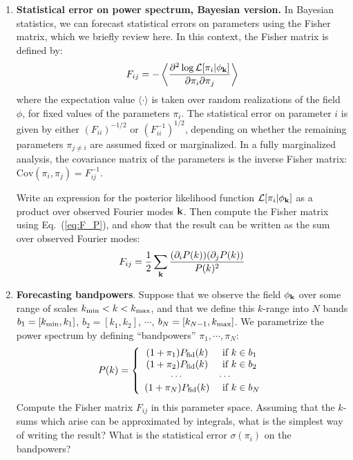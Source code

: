 \documentclass[aps,prd,superscriptaddress,groupedaddress,nofootinbib,nobibnotes]{revtex4}
\newcommand{\be}{\begin{equation}}
\newcommand{\ee}{\end{equation}}
\def\k{{\bf k}}
\def\L{{\mathcal L}}
\begin{document}
\begin{enumerate}
\setcounter{enumi}{\value{enumi_save}}

\item {\bf Statistical error on power spectrum, Bayesian version.}
  In Bayesian statistics, we can forecast statistical errors on parameters using the Fisher matrix,
  which we briefly review here.  In this context, the Fisher matrix is defined by:
\be
F_{ij} = -\left\langle \frac{\partial^2\log\L[\pi_i|\phi_{\k}]}{\partial\pi_i \partial\pi_j} \right\rangle  \label{eq:F_P}
\ee
  where the expectation value $\langle \cdot \rangle$ is taken over random realizations of the field $\phi$,
  for fixed values of the parameters $\pi_i$.
  The statistical error on parameter $i$ is given by either $(F_{ii})^{-1/2}$ or $(F^{-1}_{ii})^{1/2}$,
  depending on whether the remaining parameters $\pi_{j\ne i}$ are assumed fixed or marginalized.  In a
  fully marginalized analysis, the covariance matrix of the parameters is the inverse Fisher matrix:
  $\mbox{Cov}(\pi_i, \pi_j) = F^{-1}_{ij}$.

  Write an expression for the posterior likelihood function $\L[\pi_i|\phi_{\k}]$ as a product over observed Fourier modes $\k$.
  Then compute the Fisher matrix using Eq.~(\ref{eq:F_P}), and show that the result can be written as the sum over observed Fourier modes:
\be
F_{ij} = \frac{1}{2} \sum_{\k} \frac{(\partial_i P(k)) (\partial_j P(k))}{P(k)^2}  \label{eq:F_P2}
\ee
\item {\bf Forecasting bandpowers}.
  Suppose that we observe the field $\phi_{\k}$ over some range of scales $k_{\rm min} < k < k_{\rm max}$,
  and that we define this $k$-range into $N$ bands $b_1 = [k_{\rm min}, k_1]$, $b_2 = [k_1, k_2]$, $\cdots$, 
  $b_N = [k_{N-1}, k_{\rm max}]$.  We parametrize the power spectrum by defining ``bandpowers'' $\pi_1, \cdots, \pi_N$:
\be
 P(k) = \left\{
  \begin{array}{cl}
    (1 + \pi_1) P_{\rm fid}(k) & \mbox{ if $k\in b_1$} \\
    (1 + \pi_2) P_{\rm fid}(k) & \mbox{ if $k\in b_2$} \\
      \cdots & \cdots \\
    (1 + \pi_N) P_{\rm fid}(k) & \mbox{ if $k\in b_N$}
  \end{array} \right.
\ee
  Compute the Fisher matrix $F_{ij}$ in this parameter space.
  Assuming that the $k$-sums which arise can be approximated by integrals, what is the simplest way of writing the result?
  What is the statistical error $\sigma(\pi_i)$ on the bandpowers?


\end{enumerate}
\end{document}
